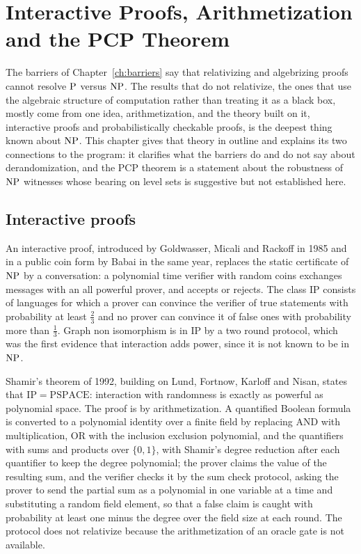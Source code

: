 \chapter{Interactive Proofs, Arithmetization and the PCP Theorem}
\label{ch:pcp}

The barriers of Chapter~\ref{ch:barriers} say that relativizing and algebrizing proofs cannot resolve $\mathrm{P}$ versus $\mathrm{NP}$. The results that do not relativize, the ones that use the algebraic structure of computation rather than treating it as a black box, mostly come from one idea, arithmetization, and the theory built on it, interactive proofs and probabilistically checkable proofs, is the deepest thing known about $\mathrm{NP}$. This chapter gives that theory in outline and explains its two connections to the program: it clarifies what the barriers do and do not say about derandomization, and the PCP theorem is a statement about the robustness of $\mathrm{NP}$ witnesses whose bearing on level sets is suggestive but not established here.

\section{Interactive proofs}

An interactive proof, introduced by Goldwasser, Micali and Rackoff in 1985 and in a public coin form by Babai in the same year, replaces the static certificate of $\mathrm{NP}$ by a conversation: a polynomial time verifier with random coins exchanges messages with an all powerful prover, and accepts or rejects. The class $\mathrm{IP}$ consists of languages for which a prover can convince the verifier of true statements with probability at least $\tfrac23$ and no prover can convince it of false ones with probability more than $\tfrac13$. Graph non isomorphism is in $\mathrm{IP}$ by a two round protocol, which was the first evidence that interaction adds power, since it is not known to be in $\mathrm{NP}$.

Shamir's theorem of 1992, building on Lund, Fortnow, Karloff and Nisan, states that $\mathrm{IP} = \mathrm{PSPACE}$: interaction with randomness is exactly as powerful as polynomial space. The proof is by arithmetization. A quantified Boolean formula is converted to a polynomial identity over a finite field by replacing AND with multiplication, OR with the inclusion exclusion polynomial, and the quantifiers with sums and products over $\{0, 1\}$, with Shamir's degree reduction after each quantifier to keep the degree polynomial; the prover claims the value of the resulting sum, and the verifier checks it by the sum check protocol, asking the prover to send the partial sum as a polynomial in one variable at a time and substituting a random field element, so that a false claim is caught with probability at least one minus the degree over the field size at each round. The protocol does not relativize because the arithmetization of an oracle gate is not available.

